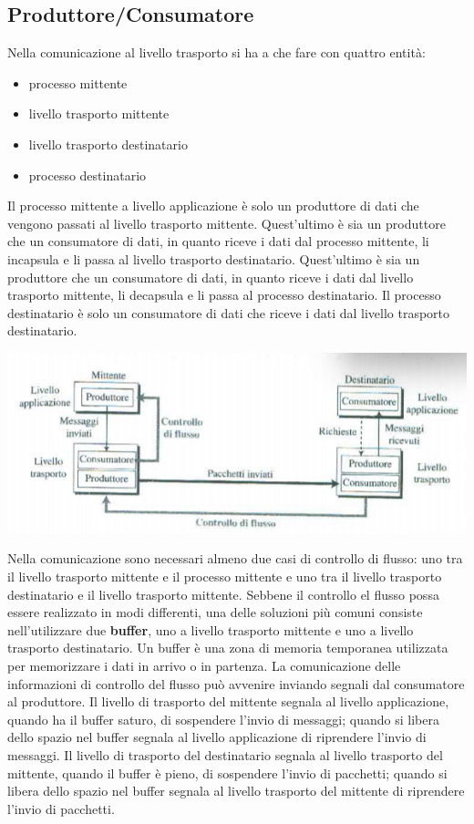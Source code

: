 \documentclass[12pt]{report}
\begin{document}
	\subsection*{Produttore/Consumatore}
	Nella comunicazione al livello trasporto si ha a che fare con quattro entità:
	\begin{itemize}
		\item processo mittente
		\item livello trasporto mittente
		\item livello trasporto destinatario
		\item processo destinatario
	\end{itemize}
	Il processo mittente a livello applicazione è solo un produttore di dati che vengono passati al livello trasporto mittente. Quest'ultimo è sia un produttore che un consumatore di dati, in quanto riceve i dati dal processo mittente, li incapsula e li passa al livello trasporto destinatario. Quest'ultimo è sia un produttore che un consumatore di dati, in quanto riceve i dati dal livello trasporto mittente, li decapsula e li passa al processo destinatario. Il processo destinatario è solo un consumatore di dati che riceve i dati dal livello trasporto destinatario.
	\begin{center}
		\includegraphics[scale=0.5]{assets/prod-cons.png}
	\end{center}
	Nella comunicazione sono necessari almeno due casi di controllo di flusso: uno tra il livello trasporto mittente e il processo mittente e uno tra il livello trasporto destinatario e il livello trasporto mittente.  Sebbene il controllo el flusso possa essere realizzato in modi differenti, una delle soluzioni più comuni consiste nell'utilizzare due \textbf{buffer}, uno a livello trasporto mittente e uno a livello trasporto destinatario. Un buffer è una zona di memoria temporanea utilizzata per memorizzare i dati in arrivo o in partenza. La comunicazione delle informazioni di controllo del flusso può avvenire inviando segnali dal consumatore al produttore. Il livello di trasporto del mittente segnala al livello applicazione, quando ha il buffer saturo, di sospendere l'invio di messaggi; quando si libera dello spazio nel buffer segnala al livello applicazione di riprendere l'invio di messaggi. Il livello di trasporto del destinatario segnala al livello trasporto del mittente, quando il buffer è pieno, di sospendere l'invio di pacchetti; quando si libera dello spazio nel buffer segnala al livello trasporto del mittente di riprendere l'invio di pacchetti.
\end{document}
